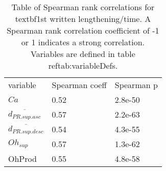 \begin{table}[H]
\centering
\caption[Linear regressions for 1st written lengthening/time]{Table of Spearman rank correlations for \\textbf{1st written lengthening/time}. A Spearman rank correlation coefficient of -1 or 1 indicates a strong correlation. Variables are defined in table \\ref{tab:variableDefs}.}
\label{tab:dwndt_w1oReg}
\begin{tabular}{lll}
                    variable & Spearman coeff & Spearman p \\
                        $Ca$ &           0.52 &    2.8e-50 \\
 $\overline{d_{PR.sup.asc}}$ &           0.57 &    2.2e-63 \\
$\overline{d_{PR.sup.desc}}$ &           0.54 &    4.3e-55 \\
                  $Oh_{sup}$ &           0.57 &    1.3e-62 \\
                      OhProd &           0.55 &    4.8e-58 \\
\end{tabular}
\end{table}
